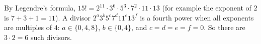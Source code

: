By Legendre's formula, $15!=2^{11}\cdot3^{6}\cdot5^{3}\cdot7^{2}\cdot11\cdot13$ (for example the exponent of $2$ is $7+3+1=11$). A divisor $2^a3^b5^c7^d11^e13^f$ is a fourth power when all exponents are multiples of $4$: $a\in\{0,4,8\}$, $b\in\{0,4\}$, and $c=d=e=f=0$. So there are $3\cdot2=\boxed{6}$ such divisors.
